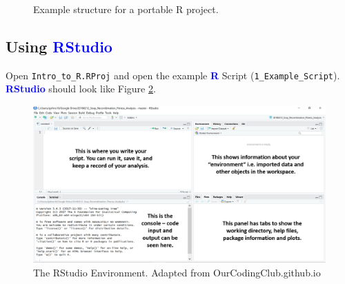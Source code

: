 \documentclass[a4paper,12pt]{article}
\newcommand\boldblue[1]{\textcolor{blue}{\textbf{#1}}}
\begin{document}
\begin{figure}[h]
	\centering 
	\caption{Example structure for a portable R project.}
	\label{fig:data_structure}
\end{figure} 


\subsection {Using \boldblue{RStudio}}

Open \texttt{Intro\_to\_R.RProj} and open the example \boldblue{R} Script (\texttt{1\_Example\_Script}). \boldblue{RStudio} should look like Figure \ref{fig:R_Studio}. 
\\

\begin{figure}[h]
	\centering 
	\includegraphics[width=1.1\textwidth]{figs/R_Studio.png}
	\caption{The RStudio Environment. Adapted from OurCodingClub.github.io}
	\label{fig:R_Studio}
\end{figure} 
\end{document}

